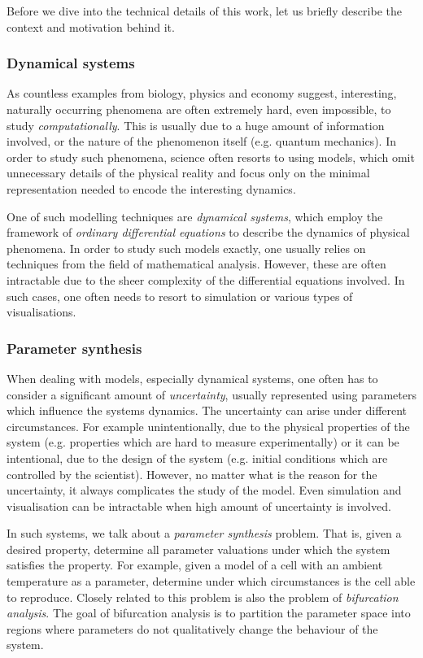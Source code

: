 Before we dive into the technical details of this work, let us briefly describe the context and motivation behind it.

\subsubsection{\textbf{Dynamical systems}}

As countless examples from biology, physics and economy suggest, interesting, naturally occurring phenomena are often extremely hard, even impossible, to study \emph{computationally}. This is usually due to a huge amount of information involved, or the nature of the phenomenon itself (e.g. quantum mechanics). In order to study such phenomena, science often resorts to using models, which omit unnecessary details of the physical reality and focus only on the minimal representation needed to encode the interesting dynamics.

One of such modelling techniques are \emph{dynamical systems}, which employ the framework of \emph{ordinary differential equations} to describe the dynamics of physical phenomena. In order to study such models exactly, one usually relies on techniques from the field of mathematical analysis. However, these are often intractable due to the sheer complexity of the differential equations involved. In such cases, one often needs to resort to simulation or various types of visualisations.

\subsubsection{\textbf{Parameter synthesis}}

When dealing with models, especially dynamical systems, one often has to consider a significant amount of \emph{uncertainty}, usually represented using parameters which influence the systems dynamics. The uncertainty can arise under different circumstances. For example unintentionally, due to the physical properties of the system (e.g. properties which are hard to measure experimentally) or it can be intentional, due to the design of the system (e.g. initial conditions which are controlled by the scientist). However, no matter what is the reason for the uncertainty, it always complicates the study of the model. Even simulation and visualisation can be intractable when high amount of uncertainty is involved. 

In such systems, we talk about a \emph{parameter synthesis} problem. That is, given a desired property, determine all parameter valuations under which the system satisfies the property. For example, given a model of a cell with an ambient temperature as a parameter, determine under which circumstances is the cell able to reproduce. Closely related to this problem is also the problem of \emph{bifurcation analysis}. The goal of bifurcation analysis is to partition the parameter space into regions where parameters do not qualitatively change the behaviour of the system.

